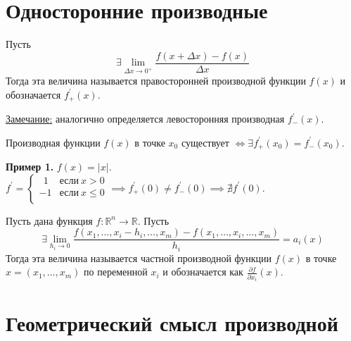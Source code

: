 \documentclass{article}
\begin{document}
\section*{Односторонние производные}

\begin{definition}
    Пусть \[\exists \lim\limits_{\Delta x \to 0^+} \frac{f(x + \Delta x) - f(x)}{\Delta x}\]
    Тогда эта величина называется правосторонней производной функции \(f(x)\) и обозначается \(f^{\prime}_{+}(x)\). 
\end{definition}
\noindent
\underline{Замечание:} аналогично определяется левосторонняя производная \(f^{\prime}_{-}(x)\).

\begin{claim}
    Производная функции \(f(x)\) в точке \(x_0\) существует \(\iff \exists f^{\prime}_{+}(x_0) = f^{\prime}_{-}(x_0)\). 
\end{claim}
\noindent
\textbf{Пример 1.} \(f(x) = \left\vert x \right\vert\). \(\displaystyle f^{\prime} =
\begin{cases}
    \ \ 1 & \text{если}\ x > 0\\
    -1 & \text{если}\ x \leq 0\\  
\end{cases} \implies 
f^{\prime}_{+}(0) \neq f^{\prime}_{-}(0) \implies \nexists f^{\prime}(0)\).

\begin{definition}
    Пусть дана функция \(f: \mathbb{R}^n \to \mathbb{R}\). Пусть
    \[
        \exists \lim\limits_{h_{i} \to 0} \frac{f(x_{1}, \dots , x_{i} - h_{i}, \dots , x_{m}) - f(x_{1}, \dots, x_{i}, \dots, x_{m})}{h_{i}} = a_{i}(x)
    \]
    Тогда эта величина называется частной производной функции \(f(x)\) в точке \(x = (x_{1}, \dots, x_{m})\) по переменной \(x_{i}\) и обозначается как \(\displaystyle \frac{\partial f}{\partial x_{i}}(x)\). 
\end{definition}

\section*{Геометрический смысл производной}
\end{document}
